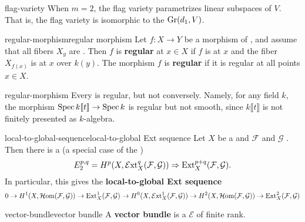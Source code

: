 \begin{example}{flag-variety}
    When $m = 2$, the flag variety parametrizes linear subspaces of $V$. That is, the flag variety is isomorphic to the  $\textup{Gr}(d_1, V)$.
\end{example}

\begin{topic}{regular-morphism}{regular morphism}
    Let $f : X \to Y$ be a morphism of , and assume that all fibers $X_y$ are . Then $f$ is \textbf{regular} at $x \in X$ if $f$ is  at $x$ and the fiber $X_{f(x)}$ is  at $x$ over $k(y)$. The morphism $f$ is \textbf{regular} if it is regular at all points $x \in X$.
\end{topic}

\begin{example}{regular-morphism}
    Every  is regular, but not conversely. Namely, for any field $k$, the morphism $\operatorname{Spec} k \llbracket t \rrbracket \to \operatorname{Spec} k$ is regular but not smooth, since $k \llbracket t \rrbracket$ is not finitely presented as $k$-algebra. 
\end{example}

\begin{topic}{local-to-global-sequence}{local-to-global Ext sequence}
    Let $X$ be a  and $\mathcal{F}$ and $\mathcal{G}$ . Then there is a  (a special case of the )
    \[ E_2^{p, q} = H^p(X, \mathcal{E}\textup{xt}_X^q(\mathcal{F}, \mathcal{G})) \Rightarrow \textup{Ext}_X^{p + q}(\mathcal{F}, \mathcal{G}) . \]
    In particular, this gives the \textbf{local-to-global Ext sequence}
    \[ 0 \to H^1(X, \mathcal{H}\textup{om}(\mathcal{F}, \mathcal{G})) \to \textup{Ext}_X^1(\mathcal{F}, \mathcal{G}) \to H^0(X, \mathcal{E}\textup{xt}_X^1(\mathcal{F}, \mathcal{G})) \to H^2(X, \mathcal{H}\textup{om}(\mathcal{F}, \mathcal{G})) \to \textup{Ext}_X^2(\mathcal{F}, \mathcal{G}) \]
\end{topic}

\begin{topic}{vector-bundle}{vector bundle}
    A \textbf{vector bundle} is a  $\mathcal{E}$ of finite rank.
\end{topic}

